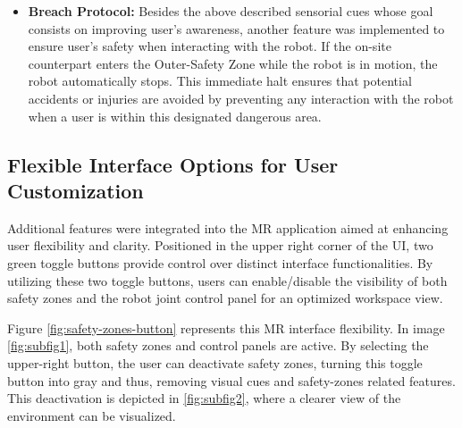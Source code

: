 \begin{itemize}
\item \textbf{Breach Protocol:} Besides the above described sensorial cues whose goal consists on improving user's awareness, another feature was implemented to ensure user's safety when interacting with the robot. If the on-site counterpart enters the Outer-Safety Zone while the robot is in motion, the robot automatically stops. This immediate halt ensures that potential accidents or injuries are avoided by preventing any interaction with the robot when a user is within this designated dangerous area.
\end{itemize}
    
\subsection{Flexible Interface Options for User Customization}

Additional features were integrated into the \ac{MR} application aimed at enhancing user flexibility and clarity. Positioned in the upper right corner of the \ac{UI}, two green toggle buttons provide control over distinct interface functionalities. By utilizing these two toggle buttons, users can enable/disable the visibility of both safety zones and the robot joint control panel for an optimized workspace view. 


Figure \ref{fig:safety-zones-button} represents this \ac{MR} interface flexibility. In image \ref{fig:subfig1}, both safety zones and control panels are active. By selecting the upper-right button, the user can deactivate safety zones, turning this toggle button into gray and thus, removing visual cues and safety-zones related features. This deactivation is depicted in \ref{fig:subfig2}, where a clearer view of the environment can be visualized.

